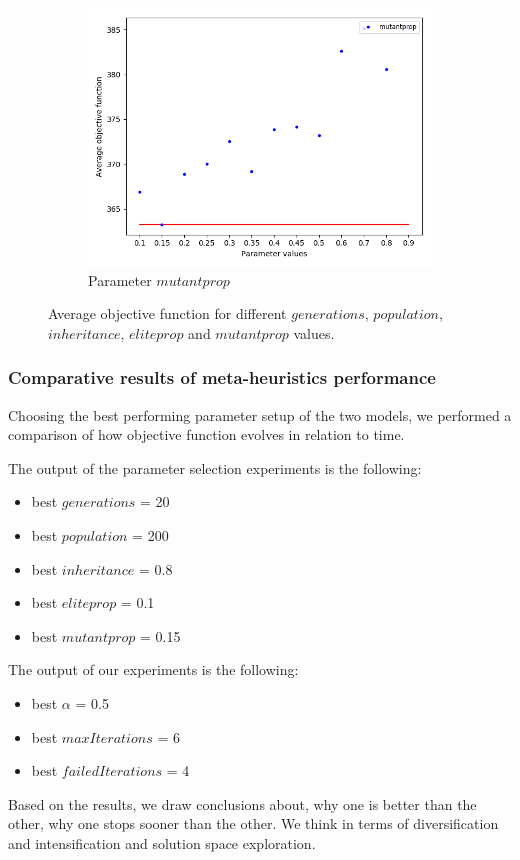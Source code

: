 \begin{figure}[H]
\begin{subfigure}[b]{.49\linewidth}
\includegraphics[width=\linewidth]{./img/best-mutantprop.png}
\caption{Parameter $mutantprop$ }\label{fig2e}
\end{subfigure}%
\caption{Average objective function for different  $generations$,  $population$,  $inheritance$,  $eliteprop$ and  $mutantprop$ values.  }
\label{fig_brkga_params}
\end{figure}





\subsubsection{Comparative results of meta-heuristics performance}

Choosing the best performing parameter setup of the two models, we performed a comparison of how objective function evolves in relation to time.

The output of the parameter selection experiments is the following: 
\begin{itemize}
	\item best $generations$ = 20
	\item best $population$ = 200
	\item best $inheritance$ = 0.8
	\item best $eliteprop$ = 0.1
	\item best $mutantprop$ = 0.15
\end{itemize}

The output of our experiments is the following: 
\begin{itemize}
	\item best $\alpha$ = 0.5
	\item best $maxIterations$ = 6
	\item best $failedIterations$ = 4
\end{itemize}


Based on the results, we draw conclusions about, why one is better than the other, why one stops sooner than the other. We think in terms of diversification and intensification and solution space exploration.\\

\pagebreak
